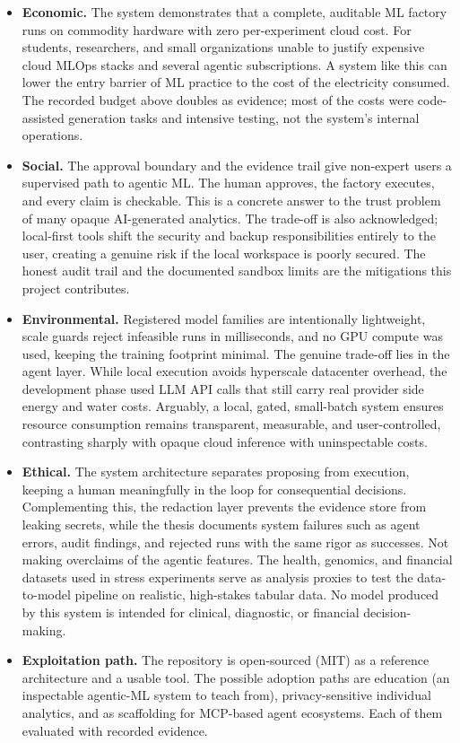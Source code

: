 \begin{itemize}
	\item \textbf{Economic.} The system demonstrates that a complete, auditable ML factory runs on commodity hardware with zero per-experiment cloud cost. For students, researchers, and small organizations unable to justify expensive cloud MLOps stacks and several agentic subscriptions. A system like this can lower the entry barrier of ML practice to the cost of the electricity consumed. The recorded budget above doubles as evidence; most of the costs were code-assisted generation tasks and intensive testing, not the system's internal operations.

	\item \textbf{Social.} The approval boundary and the evidence trail give non-expert users a supervised path to agentic ML. The human approves, the factory executes, and every claim is checkable. This is a concrete answer to the trust problem of many opaque AI-generated analytics. The trade-off is also acknowledged; local-first tools shift the security and backup responsibilities entirely to the user, creating a genuine risk if the local workspace is poorly secured. The honest audit trail and the documented sandbox limits are the mitigations this project contributes.

	\item \textbf{Environmental.} Registered model families are intentionally lightweight, scale guards reject infeasible runs in milliseconds, and no GPU compute was used, keeping the training footprint minimal. The genuine trade-off lies in the agent layer. While local execution avoids hyperscale datacenter overhead, the development phase used LLM API calls that still carry real provider side energy and water costs. Arguably, a local, gated, small-batch system ensures resource consumption remains transparent, measurable, and user-controlled, contrasting sharply with opaque cloud inference with uninspectable costs.


	\item \textbf{Ethical.} The system architecture separates proposing from execution, keeping a human meaningfully in the loop for consequential decisions. Complementing this, the redaction layer prevents the evidence store from leaking secrets, while the thesis documents system failures such as agent errors, audit findings, and rejected runs with the same rigor as successes. Not making overclaims of the agentic features. The health, genomics, and financial datasets used in stress experiments serve as analysis proxies to test the data-to-model pipeline on realistic, high-stakes tabular data. No model produced by this system is intended for clinical, diagnostic, or financial decision-making.

	\item \textbf{Exploitation path.} The repository is open-sourced (MIT) as a reference architecture and a usable tool. The possible adoption paths are education (an inspectable agentic-ML system to teach from), privacy-sensitive individual analytics, and as scaffolding for MCP-based agent ecosystems. Each of them evaluated with recorded evidence.
\end{itemize}
